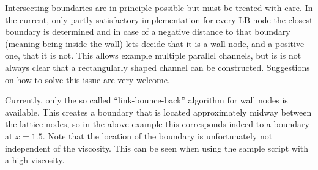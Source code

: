 Intersecting boundaries are in principle possible but must be treated
with care. In the current, only partly satisfactory implementation for
every LB node the closest boundary is determined and in case of a
negative distance to that boundary (meaning being inside the wall)
lets \es decide that it is a wall node, and a positive one, that it is
not.  This allows example multiple parallel channels, but is is not
always clear that a rectangularly shaped channel can be
constructed. Suggestions on how to solve this issue are very welcome.

Currently, only the so called ``link-bounce-back'' algorithm for wall
nodes is available. This creates a boundary that is located
approximately midway between the lattice nodes, so in the above
example this corresponds indeed to a boundary at $x=1.5$. Note that
the location of the boundary is unfortunately not independent of the
viscosity. This can \eg be seen when using the sample script
 with a high viscosity.
